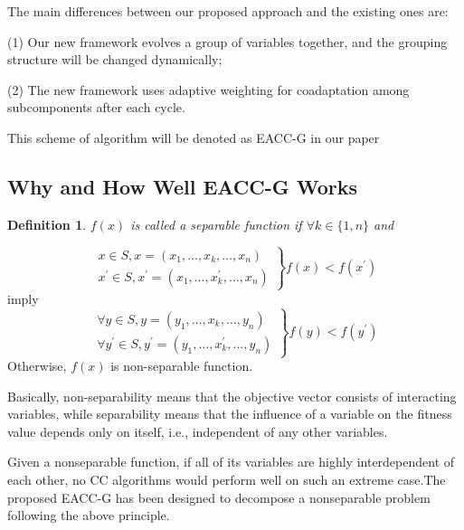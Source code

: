 \documentclass{article}
\newtheorem{definition}{Definition}
{\theorembodyfont{\rmfamily}\newtheorem{remark}{Remark}}
\begin{document}
The main differences between our proposed approach and the existing ones are:

(1) Our new framework evolves a group of variables together, and the grouping
structure will be changed dynamically;

(2) The new framework uses adaptive weighting for coadaptation among
subcomponents after each cycle.

This scheme of algorithm will be denoted as {\color[HTML]{AAAAFF}EACC-G} in
our paper

\subsection{Why and How Well EACC-G Works}

\begin{definition}
  $f (x)$ is called a separable function if $\forall k \in \{1, n\}$ and
\end{definition}
\begin{equation}
  \left. \begin{array}{l}
    x \in S, x = (x_1, \ldots, x_k, \ldots, x_n)\\
    x^{'} \in S , x^{'} = (x_1, \ldots, x^{'}_k, \ldots, x_n)
  \end{array} \right\} f (x) < f (x^{'})
\end{equation}
imply
\begin{equation}
  \left. \begin{array}{l}
    \forall y \in S, y = (y_1, \ldots, x_k, \ldots, y_n)\\
    \forall y^{'} \in S , y^{'} = (y_1, \ldots, x^{'}_k, \ldots, y_n)
  \end{array} \right\} f (y) < f (y^{'})
\end{equation}
Otherwise, $f (x)$ is non-separable function.

\begin{remark}
  Basically, non-separability means that the objective vector consists of
  interacting variables, while separability means that the influence of a
  variable on the fitness value depends only on itself, i.e., independent of
  any other variables.
\end{remark}

Given a nonseparable function, if all of its variables are highly
interdependent of each other, no CC algorithms would perform well on such an
extreme case.The proposed EACC-G has been designed to decompose a nonseparable
problem following the above principle.
\end{document}
